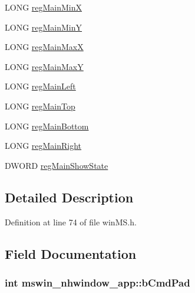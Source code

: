 \begin{DoxyCompactItemize}
\item 
L\+O\+N\+G \hyperlink{structmswin__nhwindow__app_a7a0b798261b9482e14eaacc0d4bd1fb0}{reg\+Main\+Min\+X}
\item 
L\+O\+N\+G \hyperlink{structmswin__nhwindow__app_a4d5b28c825db1c51fee77ceabbac0bad}{reg\+Main\+Min\+Y}
\item 
L\+O\+N\+G \hyperlink{structmswin__nhwindow__app_a39cbafd956ec42730695d92a85cc0f8e}{reg\+Main\+Max\+X}
\item 
L\+O\+N\+G \hyperlink{structmswin__nhwindow__app_a30fff66ef9cdfb4e7b8fd4c95ea67d8e}{reg\+Main\+Max\+Y}
\item 
L\+O\+N\+G \hyperlink{structmswin__nhwindow__app_a4ed5841c55538304dde5389e7652631a}{reg\+Main\+Left}
\item 
L\+O\+N\+G \hyperlink{structmswin__nhwindow__app_a658a499d91cb14c1da4dcb44b4bb1633}{reg\+Main\+Top}
\item 
L\+O\+N\+G \hyperlink{structmswin__nhwindow__app_aeb2d03a559d6186f46fea9f56def55d1}{reg\+Main\+Bottom}
\item 
L\+O\+N\+G \hyperlink{structmswin__nhwindow__app_a9447cc1eb6b2e0586ec2b725614e277a}{reg\+Main\+Right}
\item 
D\+W\+O\+R\+D \hyperlink{structmswin__nhwindow__app_ae338ffa2fd42895c5a6800fd1ba8f5bd}{reg\+Main\+Show\+State}
\end{DoxyCompactItemize}


\subsection{Detailed Description}


Definition at line 74 of file win\+M\+S.\+h.



\subsection{Field Documentation}
\hypertarget{structmswin__nhwindow__app_ad92d2a6da1489504549e4cd7d8237d8e}{
\subsubsection[{b\+Cmd\+Pad}]{\setlength{\rightskip}{0pt plus 5cm}int mswin\+\_\+nhwindow\+\_\+app\+::b\+Cmd\+Pad}}\label{structmswin__nhwindow__app_ad92d2a6da1489504549e4cd7d8237d8e}


